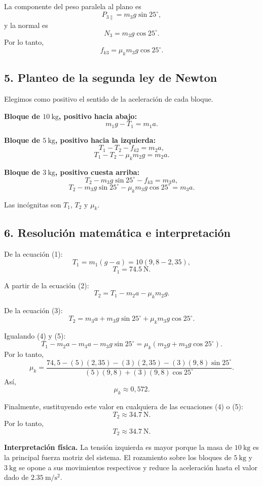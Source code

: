 \documentclass[12pt]{article}
\newcounter{ejercicio}
\newcommand{\paso}[2]{%
  \subsection*{\color{AzulFisica}#1. #2}%
}
\begin{document}
La componente del peso paralela al plano es
\[
P_{3\parallel}=m_3g\sin25^\circ,
\]
y la normal es
\[
N_3=m_3g\cos25^\circ.
\]
Por lo tanto,
\[
f_{k3}=\mu_km_3g\cos25^\circ.
\]

\paso{5}{Planteo de la segunda ley de Newton}
Elegimos como positivo el sentido de la aceleración de cada bloque.

\textbf{Bloque de $\SI{10}{\kilogram}$, positivo hacia abajo:}
\[
m_1g-T_1=m_1a.
\tag{1}
\]

\textbf{Bloque de $\SI{5}{\kilogram}$, positivo hacia la izquierda:}
\[
T_1-T_2-f_{k2}=m_2a,
\]
\[
T_1-T_2-\mu_km_2g=m_2a.
\tag{2}
\]

\textbf{Bloque de $\SI{3}{\kilogram}$, positivo cuesta arriba:}
\[
T_2-m_3g\sin25^\circ-f_{k3}=m_3a,
\]
\[
T_2-m_3g\sin25^\circ-\mu_km_3g\cos25^\circ=m_3a.
\tag{3}
\]

Las incógnitas son $T_1$, $T_2$ y $\mu_k$.

\paso{6}{Resolución matemática e interpretación}
De la ecuación (1):
\[
T_1=m_1(g-a)=10(9,8-2,35),
\]
\[
\boxed{T_1=\SI{74.5}{\newton}}.
\]

A partir de la ecuación (2):
\[
T_2=T_1-m_2a-\mu_km_2g.
\tag{4}
\]

De la ecuación (3):
\[
T_2=m_3a+m_3g\sin25^\circ+\mu_km_3g\cos25^\circ.
\tag{5}
\]

Igualando (4) y (5):
\[
T_1-m_2a-m_3a-m_3g\sin25^\circ
=\mu_k\left(m_2g+m_3g\cos25^\circ\right).
\]
Por lo tanto,
\[
\mu_k=
\frac{74,5-(5)(2,35)-(3)(2,35)-(3)(9,8)\sin25^\circ}
{(5)(9,8)+(3)(9,8)\cos25^\circ}.
\]
Así,
\[
\boxed{\mu_k\approx0,572}.
\]

Finalmente, sustituyendo este valor en cualquiera de las ecuaciones (4) o (5):
\[
T_2\approx\SI{34.7}{\newton}.
\]
Por lo tanto,
\[
\boxed{T_2\approx\SI{34.7}{\newton}}.
\]

\vspace{0.5em}
\begin{center}
\end{center}

\textbf{Interpretación física.} La tensión izquierda es mayor porque la masa de $\SI{10}{\kilogram}$ es la principal fuerza motriz del sistema. El rozamiento sobre los bloques de $\SI{5}{\kilogram}$ y $\SI{3}{\kilogram}$ se opone a sus movimientos respectivos y reduce la aceleración hasta el valor dado de $\SI{2.35}{\meter\per\second\squared}$.
\end{document}

